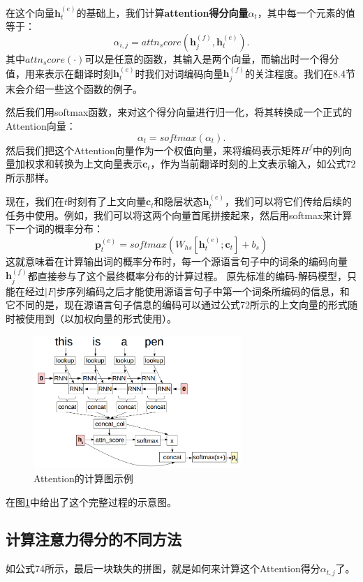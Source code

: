 \documentclass[10pt,a4paper]{ctexart}
\begin{document}
在这个向量$\textbf{h}_t^{(e)}$的基础上，我们计算\textbf{attention得分向量}$\textbf{$\alpha$}_t$，其中每一个元素的值等于：
\[
 \alpha_{i,j} = attn_score(\textbf{h}_j^{(f)},\textbf{h}_t^{(e)}).
\]
其中$attn_score(\cdot)$可以是任意的函数，其输入是两个向量，而输出时一个得分值，用来表示在翻译时刻$\textbf{h}_t^{(e)}$时我们对词编码向量$\textbf{h}_j^{(f)}$的关注程度。我们在8.4节末会介绍一些这个函数的例子。

然后我们用softmax函数，来对这个得分向量进行归一化，将其转换成一个正式的Attention向量：
\[
 \textbf{$\alpha$}_t = softmax(\textbf{$\alpha$}_t).
\]
然后我们把这个Attention向量作为一个权值向量，来将编码表示矩阵$H^{f}$中的列向量加权求和转换为上文向量表示$\textbf{c}_t$，作为当前翻译时刻的上文表示输入，如公式72所示那样。

现在，我们在$t$时刻有了上文向量$\textbf{c}_t$和隐层状态$\textbf{h}_t^{(e)}$，我们可以将它们传给后续的任务中使用。例如，我们可以将这两个向量首尾拼接起来，然后用softmax来计算下一个词的概率分布：
\[
 \textbf{p}_t^{(e)} = softmax(W_{hs}[\textbf{h}_t^{(e)};\textbf{c}_t] + b_s)
\]
这就意味着在计算输出词的概率分布时，每一个源语言句子中的词条的编码向量$\textbf{h}_j^{(f)}$都直接参与了这个最终概率分布的计算过程。
原先标准的编码-解码模型，只能在经过$|F|$步序列编码之后才能使用源语言句子中第一个词条所编码的信息，和它不同的是，现在源语言句子信息的编码可以通过公式72所示的上文向量的形式随时被使用到（以加权向量的形式使用）。

\begin{figure}[H]
\centering
\includegraphics[width=0.7\textwidth]{fig28.png}
\caption{Attention的计算图示例}
\label{fig:28}
\end{figure}

在图\ref{fig:28}中给出了这个完整过程的示意图。

\subsection{计算注意力得分的不同方法}
如公式74所示，最后一块缺失的拼图，就是如何来计算这个Attention得分$\alpha_{t,j}$了。
\end{document}
